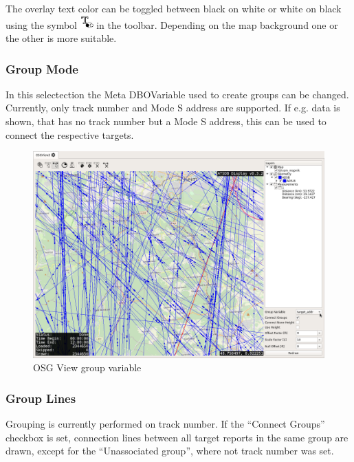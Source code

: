 {The overlay text color can be toggled between black on white or white on black using the symbol \includegraphics[width=0.5cm]{../../data/icons/text_invert.png} in the toolbar. Depending on the map background one or the other is more suitable.

\subsubsection{Group Mode}
\label{sec:group_mode}

In this selectection the Meta DBOVariable used to create groups can be changed. Currently, only track number and Mode S address are supported. If e.g. data is shown, that has no track number but a Mode S address, this can be used to connect the respective targets.

\begin{figure}[H]
    \hspace*{-2cm}
    \includegraphics[width=18cm,frame]{../screenshots/osgview_group_variable.png}
  \caption{OSG View group variable}
\end{figure}


\subsubsection{Group Lines}

Grouping is currently performed on track number. If the ``Connect Groups'' checkbox is set, connection lines between all target reports in the same group are drawn, except for the ``Unassociated group'', where not track number was set.

}

